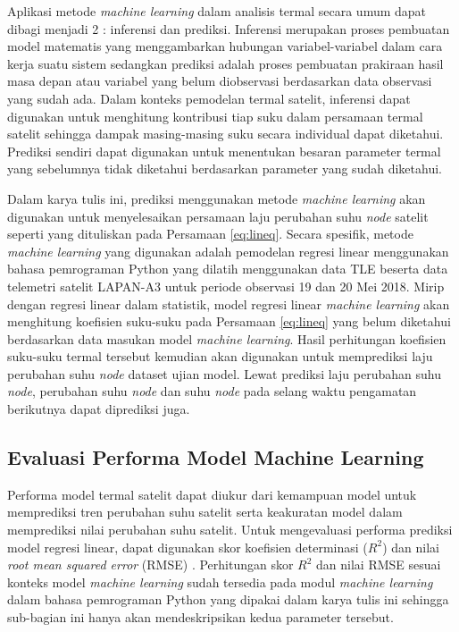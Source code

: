 Aplikasi metode \textit{machine learning} dalam analisis termal secara umum
dapat dibagi menjadi 2 : inferensi dan prediksi. Inferensi merupakan proses
pembuatan model matematis yang menggambarkan hubungan variabel-variabel dalam
cara kerja suatu sistem sedangkan prediksi adalah proses pembuatan prakiraan
hasil masa depan atau variabel yang belum diobservasi berdasarkan data
observasi yang sudah ada. Dalam konteks pemodelan termal satelit, inferensi
dapat digunakan untuk menghitung kontribusi tiap suku dalam persamaan termal
satelit sehingga dampak masing-masing suku secara individual dapat diketahui.
Prediksi sendiri dapat digunakan untuk menentukan besaran parameter termal yang
sebelumnya tidak diketahui berdasarkan parameter yang sudah diketahui.

Dalam karya tulis ini, prediksi menggunakan metode \textit{machine learning}
akan digunakan untuk menyelesaikan persamaan laju perubahan suhu \textit{node}
satelit seperti yang dituliskan pada Persamaan \ref{eq:lineq}. Secara spesifik,
metode \textit{machine learning} yang digunakan adalah pemodelan regresi linear
menggunakan bahasa pemrograman Python yang dilatih menggunakan data TLE beserta
data telemetri satelit LAPAN-A3 untuk periode observasi 19 dan 20 Mei 2018.
Mirip dengan regresi linear dalam statistik, model regresi linear
\textit{machine learning} akan menghitung koefisien suku-suku pada Persamaan
\ref{eq:lineq} yang belum diketahui berdasarkan data masukan model
\textit{machine learning}. Hasil perhitungan koefisien suku-suku termal
tersebut kemudian akan digunakan untuk memprediksi laju perubahan suhu
\textit{node} dataset ujian model. Lewat prediksi laju perubahan suhu
\textit{node}, perubahan suhu \textit{node} dan suhu \textit{node} pada selang
waktu pengamatan berikutnya dapat diprediksi juga.

\subsection{Evaluasi Performa Model Machine Learning}

Performa model termal satelit dapat diukur dari kemampuan model untuk
memprediksi tren perubahan suhu satelit serta keakuratan model dalam
memprediksi nilai perubahan suhu satelit. Untuk mengevaluasi performa prediksi
model regresi linear, dapat digunakan skor koefisien determinasi ($R^2$)
\cite{gupta2021} dan nilai \textit{root mean squared error} (RMSE)
\cite{zheng}. Perhitungan skor $R^2$ dan nilai RMSE sesuai konteks model
\textit{machine learning} sudah tersedia pada modul \textit{machine learning}
dalam bahasa pemrograman Python yang dipakai dalam karya tulis ini sehingga
sub-bagian ini hanya akan mendeskripsikan kedua parameter tersebut.

